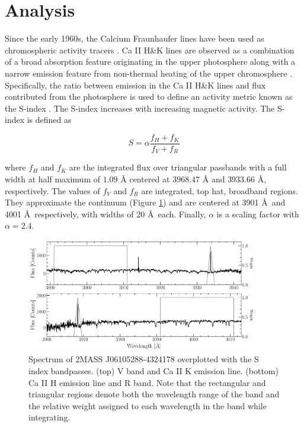 \section{Analysis}\label{sec:Analysis}
Since the early 1960s, the Calcium Fraunhaufer lines have been used as
chromospheric activity tracers \citep{Wil63}. Ca II H\&K lines are observed as
a combination of a broad absorption feature originating in the upper
photosphere along with a narrow emission feature from non-thermal heating of
the upper chromosphere \citep{Catalano1983}. Specifically, the ratio between
emission in the Ca II H\&K lines and flux contributed from the photosphere is
used to define an activity metric known as the S-index \citep{Wil68}.   The
S-index increases with increasing magnetic activity. The S-index is defined as 

\begin{equation}\label{eqn:SIndex}
    S = \alpha \frac{f_{H} + f_{K}}{f_{V} + f_{R}}    
\end{equation}

\noindent where $f_{H}$  and $f_{K}$ are the integrated flux over triangular
passbands with a full width at half maximum of $1.09\text{ \AA}$ centered at
$3968.47\text{ \AA}$ and $3933.66\text{ \AA}$, respectively. The values of
$f_{V}$ and $f_{R}$ are integrated, top hat, broadband regions. They
approximate the continuum (Figure \ref{fig:SindexBandpass}) and are centered at
3901 \AA \ and 4001 \AA \ respectively, with widths of 20 \AA \ each. Finally,
$\alpha$ is a scaling factor with $\alpha = 2.4$.

\begin{figure}[ht!]
    \centering
    \includegraphics[width=0.9\textwidth]{figures/magActivity/SIndexBandpass.pdf}
	\caption{Spectrum of 2MASS J06105288-4324178 overplotted with the S index
	bandpasses. (top) V band and Ca II K emission line. (bottom) Ca II H
	emission line and R band. Note that the rectangular and triangular
	regions denote both the wavelength range of the band and the relative
	weight assigned to each wavelength in the band while integrating. }
    \label{fig:SindexBandpass}
\end{figure}

